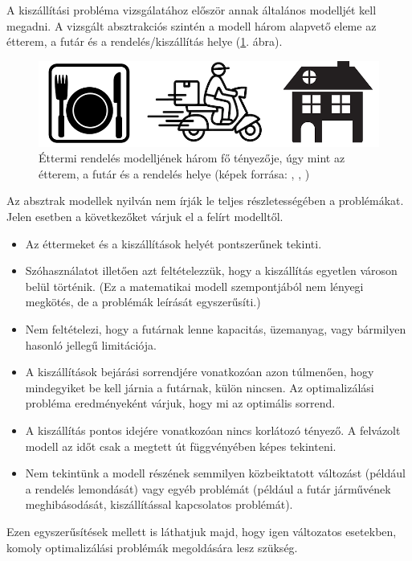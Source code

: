 
A kiszállítási probléma vizsgálatához először annak általános modelljét kell megadni.
A vizsgált absztrakciós szintén a modell három alapvető eleme az étterem, a futár és a rendelés/kiszállítás helye (\ref{fig:generalModel}. ábra).

\begin{figure}[h!]
	\centering
	\includegraphics[scale=0.5]{images/complexModel.png}
	\caption{Éttermi rendelés modelljének három fő tényezője, úgy mint az étterem, a futár és a rendelés helye (képek forrása: \cite{Image1}, \cite{Image2}, \cite{Image3})}
	\label{fig:generalModel}
\end{figure}

Az absztrak modellek nyilván nem írják le teljes részletességében a problémákat.
Jelen esetben a következőket várjuk el a felírt modelltől.
\begin{itemize}
	\item Az éttermeket és a kiszállítások helyét pontszerűnek tekinti.
	\item Szóhasználatot illetően azt feltételezzük, hogy a kiszállítás egyetlen városon belül történik. (Ez a matematikai modell szempontjából nem lényegi megkötés, de a problémák leírását egyszerűsíti.)
	\item Nem feltételezi, hogy a futárnak lenne kapacitás, üzemanyag, vagy bármilyen hasonló jellegű limitációja.
	\item A kiszállítások bejárási sorrendjére vonatkozóan azon túlmenően, hogy mindegyiket be kell járnia a futárnak, külön nincsen. Az optimalizálási probléma eredményeként várjuk, hogy mi az optimális sorrend.
	\item A kiszállítás pontos idejére vonatkozóan nincs korlátozó tényező. A felvázolt modell az időt csak a megtett út függvényében képes tekinteni.
	\item Nem tekintünk a modell részének semmilyen közbeiktatott változást (például a rendelés lemondását) vagy egyéb problémát (például a futár járművének meghibásodását, kiszállítással kapcsolatos problémát).
\end{itemize}
Ezen egyszerűsítések mellett is láthatjuk majd, hogy igen változatos esetekben, komoly optimalizálási problémák megoldására lesz szükség.

